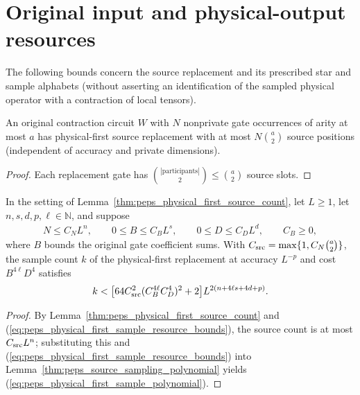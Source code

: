 \section{Original input and physical-output resources}
\label{sec:peps_physical_first_resources}

The following bounds concern the source replacement and its prescribed
star and sample alphabets (without asserting an identification of the
sampled physical operator with a contraction of local tensors).

\begin{lemma}
    \label{thm:peps_physical_first_source_count}
    \leanok
    An original contraction circuit $W$ with $N$ nonprivate gate
    occurrences of arity at most $a$ has physical-first source replacement
    with at most $N\binom a2$ source positions (independent of accuracy
    and private dimensions).
\end{lemma}
\begin{proof}
    \leanok
    Each replacement gate has $\binom{|\text{participants}|}{2}\le\binom a2$
    source slots.
\end{proof}

\begin{lemma}
    \label{thm:peps_physical_first_sample_polynomial}
    \leanok
    In the setting of Lemma~\ref{thm:peps_physical_first_source_count},
    let $L\ge1$, let $n,s,d,p,\ell\in\mathbb N$, and suppose
    \begin{align}
        N\le C_NL^n,\qquad 0\le B\le C_BL^s,\qquad 0\le D\le C_DL^d,
        \qquad C_B\ge0,
        \label{eq:peps_physical_first_sample_resource_bounds}
    \end{align}
    where $B$ bounds the original gate coefficient sums. With
    $C_{\rm src}=\max\{1,C_N\binom a2\}$, the sample count $k$ of the
    physical-first replacement at accuracy $L^{-p}$ and cost $B^{4\ell}D^4$
    satisfies
    \begin{align}
        k<\bigl[64C_{\rm src}^2(C_B^{4\ell}C_D^4)^2+2\bigr]
        L^{2(n+4\ell s+4d+p)}.
        \label{eq:peps_physical_first_sample_polynomial}
    \end{align}
\end{lemma}
\begin{proof}
    \leanok
    By Lemma~\ref{thm:peps_physical_first_source_count} and
    (\ref{eq:peps_physical_first_sample_resource_bounds}), the source count
    is at most $C_{\rm src}L^n$; substituting this and
    (\ref{eq:peps_physical_first_sample_resource_bounds}) into
    Lemma~\ref{thm:peps_source_sampling_polynomial} yields
    (\ref{eq:peps_physical_first_sample_polynomial}).
\end{proof}

